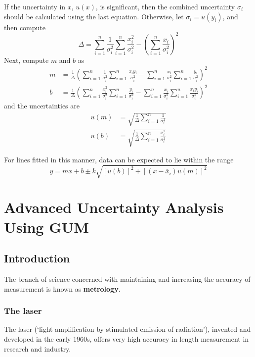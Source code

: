 If the uncertainty in $x$, $u(x)$, is significant, then the combined uncertainty $\sigma_i$ should be calculated using the last equation. Otherwise, let $\sigma_i = u(y_i)$, and then compute $$\Delta = \sum_{i=1}^n\frac{1}{\sigma_i^2}\sum_{i=1}^n\frac{x_i^2}{\sigma_i^2} - \left(\sum_{i=1}^n \frac{x_i}{\sigma_i^2}\right)^2$$ Next, compute $m$ and $b$ as \begin{align*}
    m &= \frac{1}{\Delta}\left(\sum_{i=1}^n\frac{1}{\sigma_i^2}\sum_{i=1}^n\frac{x_iy_i}{\sigma_i^2} - \sum_{i=1}^n \frac{x_i}{\sigma_i^2}\sum_{i=1}^n\frac{y_i}{\sigma_i^2}\right)^2 \\
    b &= \frac{1}{\Delta}\left(\sum_{i=1}^n\frac{x_i^2}{\sigma_i^2}\sum_{i=1}^n\frac{y_i}{\sigma_i^2} - \sum_{i=1}^n \frac{x_i}{\sigma_i^2}\sum_{i=1}^n\frac{x_iy_i}{\sigma_i^2}\right)^2
\end{align*}
and the uncertainties are \begin{align*}
    u(m) &= \sqrt{\frac{1}{\Delta}\sum_{i=1}^n\frac{1}{\sigma_i^2}} \\
    u(b) &= \sqrt{\frac{1}{\Delta}\sum_{i=1}^n\frac{x_i^2}{\sigma_i^2}}
\end{align*}

For lines fitted in this manner, data can be expected to lie within the range $$y = mx+b \pm k\sqrt{[u(b)]^2+[(x-\overline{x}_i)u(m)]^2}$$









\chapter{Advanced Uncertainty Analysis Using GUM}


\section{Introduction}

The branch of science concerned with maintaining and increasing the accuracy of measurement is known as \textbf{metrology}. 


\subsection{The laser}

The laser (`light amplification by stimulated emission of radiation'), invented and developed in the early 1960s, offers very high accuracy in length measurement in research and industry.



